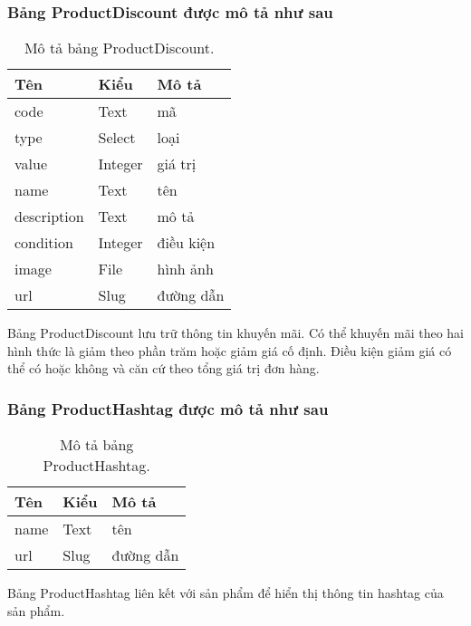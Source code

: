 \subsubsection{Bảng ProductDiscount được mô tả như sau}
\begin{table}[!htbp]\fontsize{13px}{13px}\selectfont\justifying
\begin{center}
\caption{Mô tả bảng ProductDiscount.}
\begin{tabularx}{0.6\textwidth}{ |l|l|X| } 
\hline
Tên & Kiểu & Mô tả \\
\hline
code & Text & mã \\
type & Select & loại \\
value & Integer & giá trị \\
name & Text & tên \\
description & Text & mô tả \\
condition & Integer & điều kiện \\
image & File & hình ảnh \\
url & Slug & đường dẫn \\
\hline
\end{tabularx}
\label{table:ProductDiscount}
\end{center}
Bảng ProductDiscount lưu trữ thông tin khuyến mãi. Có thể khuyến mãi theo hai hình thức là giảm theo phần trăm hoặc giảm giá cố định. Điều kiện giảm giá có thể có hoặc không và căn cứ theo tổng giá trị đơn hàng.
\end{table}
\clearpage
\subsubsection{Bảng ProductHashtag được mô tả như sau}
\begin{table}[!htbp]\fontsize{13px}{13px}\selectfont\justifying
\begin{center}
\caption{Mô tả bảng ProductHashtag.}
\begin{tabularx}{0.6\textwidth}{ |l|l|X| } 
\hline
Tên & Kiểu & Mô tả \\
\hline
name & Text & tên \\
url & Slug & đường dẫn \\
\hline
\end{tabularx}
\label{table:ProductHashtag}
\end{center}
Bảng ProductHashtag liên kết với sản phẩm để hiển thị thông tin hashtag của sản phẩm.
\end{table}

